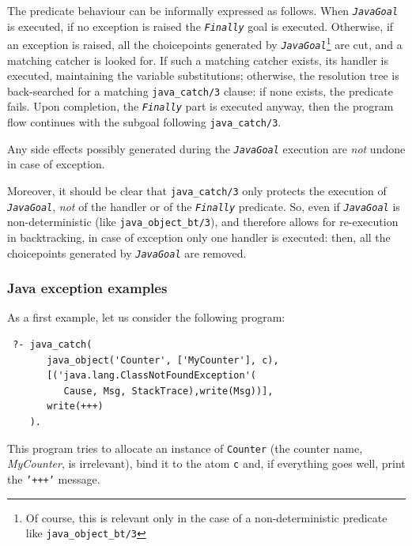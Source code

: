     The predicate behaviour can be informally expressed as follows. When \textit{\texttt{JavaGoal}} is executed, if no exception is raised
    the \texttt{\textit{Finally}} goal is executed.
    Otherwise, if an exception is raised, all the choicepoints generated by \textit{\texttt{JavaGoal}}\footnote{Of course, this is relevant only in the case of a non-deterministic predicate like \texttt{java\_object\_bt/3}} are cut, and a matching catcher is looked for. If such a matching catcher exists, its handler
    is executed, maintaining the variable substitutions; otherwise, the resolution tree is back-searched for a matching \texttt{java\_catch/3} clause: if none exists, the predicate fails.
    Upon completion, the \texttt{\textit{Finally}} part is executed anyway, then the program flow continues with the subgoal following \texttt{java\_catch/3}.

    Any side effects possibly generated during the \textit{\texttt{JavaGoal}} execution are \textit{not} undone in case of exception.

    Moreover, it should be clear that \texttt{java\_catch/3} only protects the execution of \texttt{\textit{JavaGoal}}, \textit{not} of the handler or of the \texttt{\textit{Finally}} predicate.
    So, even if \texttt{\textit{JavaGoal}} is non-deterministic (like \texttt{java\_object\_bt/3}), and therefore allows for re-execution in backtracking, in case of exception only one handler is executed: then, all the choicepoints generated by \texttt{\textit{JavaGoal}} are removed.

\subsubsection{Java exception examples}
\label{ssec:java-exception-examples}
As a first example, let us consider the following program:

\begin{verbatim}
 ?- java_catch(
       java_object('Counter', ['MyCounter'], c),
       [('java.lang.ClassNotFoundException'(
          Cause, Msg, StackTrace),write(Msg))],
       write(+++)
    ).
\end{verbatim}

\noindent This program tries to allocate an instance of \texttt{Counter} (the counter name, \textit{MyCounter}, is irrelevant), bind it to the atom \texttt{c} and, if everything goes well, print the \texttt{'+++'} message.

